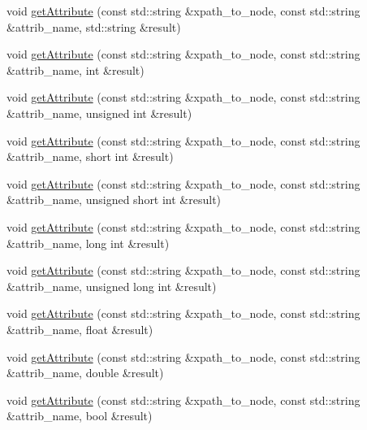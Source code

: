 \begin{DoxyCompactItemize}
\item 
void \mbox{\hyperlink{classXMLXPathReader_1_1BasicXPathReader_a963a9741f352a537bfe1a460a307c074}{get\+Attribute}} (const std\+::string \&xpath\+\_\+to\+\_\+node, const std\+::string \&attrib\+\_\+name, std\+::string \&result)
\item 
void \mbox{\hyperlink{classXMLXPathReader_1_1BasicXPathReader_a67a27824521cbe011f99c2cafff83239}{get\+Attribute}} (const std\+::string \&xpath\+\_\+to\+\_\+node, const std\+::string \&attrib\+\_\+name, int \&result)
\item 
void \mbox{\hyperlink{classXMLXPathReader_1_1BasicXPathReader_a67ba99141bc047b9f362167e4d8f8da3}{get\+Attribute}} (const std\+::string \&xpath\+\_\+to\+\_\+node, const std\+::string \&attrib\+\_\+name, unsigned int \&result)
\item 
void \mbox{\hyperlink{classXMLXPathReader_1_1BasicXPathReader_a6151cd103f1730ac598ec9d63cf11229}{get\+Attribute}} (const std\+::string \&xpath\+\_\+to\+\_\+node, const std\+::string \&attrib\+\_\+name, short int \&result)
\item 
void \mbox{\hyperlink{classXMLXPathReader_1_1BasicXPathReader_a4ba2827d293f02d0470c1b156258ee96}{get\+Attribute}} (const std\+::string \&xpath\+\_\+to\+\_\+node, const std\+::string \&attrib\+\_\+name, unsigned short int \&result)
\item 
void \mbox{\hyperlink{classXMLXPathReader_1_1BasicXPathReader_a93aba6e8e1f1bb9ea9646fd9c785ba17}{get\+Attribute}} (const std\+::string \&xpath\+\_\+to\+\_\+node, const std\+::string \&attrib\+\_\+name, long int \&result)
\item 
void \mbox{\hyperlink{classXMLXPathReader_1_1BasicXPathReader_ab4fb1448173672498fc795296d838ac9}{get\+Attribute}} (const std\+::string \&xpath\+\_\+to\+\_\+node, const std\+::string \&attrib\+\_\+name, unsigned long int \&result)
\item 
void \mbox{\hyperlink{classXMLXPathReader_1_1BasicXPathReader_a5bcbca6d3898a73559f18cde152be0a4}{get\+Attribute}} (const std\+::string \&xpath\+\_\+to\+\_\+node, const std\+::string \&attrib\+\_\+name, float \&result)
\item 
void \mbox{\hyperlink{classXMLXPathReader_1_1BasicXPathReader_a4278ca0d297a82127b737339de448424}{get\+Attribute}} (const std\+::string \&xpath\+\_\+to\+\_\+node, const std\+::string \&attrib\+\_\+name, double \&result)
\item 
void \mbox{\hyperlink{classXMLXPathReader_1_1BasicXPathReader_a3732bdb3a62ba9fa759b65b56633997f}{get\+Attribute}} (const std\+::string \&xpath\+\_\+to\+\_\+node, const std\+::string \&attrib\+\_\+name, bool \&result)

\end{DoxyCompactItemize}
